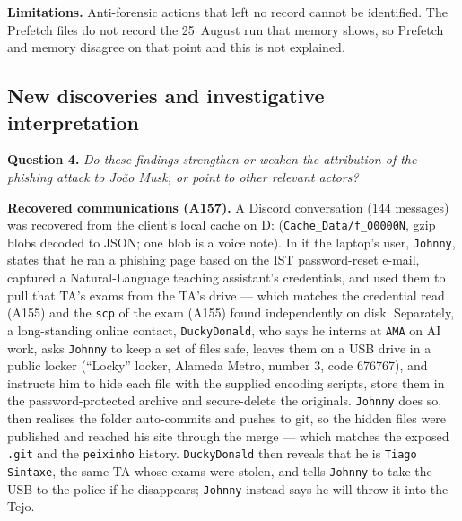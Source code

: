 \documentclass[11pt,a4paper,final,oneside]{article}
\begin{document}
\textbf{Limitations.} Anti-forensic actions that left no record cannot be identified. The Prefetch files do not record the 25~August run that memory shows, so Prefetch and memory disagree on that point and this is not explained.

\subsection{New discoveries and investigative interpretation}
\label{sec:q4}

\textbf{Question 4.} \textit{Do these findings strengthen or weaken the attribution of the phishing attack to João Musk, or point to other relevant actors?}

\textbf{Recovered communications (A157).} A Discord conversation (144 messages) was recovered from the client's local cache on D: (\texttt{Cache\_Data/f\_00000N}, gzip blobs decoded to JSON; one blob is a voice note). In it the laptop's user, \texttt{Johnny}, states that he ran a phishing page based on the IST password-reset e-mail, captured a Natural-Language teaching assistant's credentials, and used them to pull that TA's exams from the TA's drive --- which matches the credential read (A155) and the \texttt{scp} of the exam (A155) found independently on disk. Separately, a long-standing online contact, \texttt{DuckyDonald}, who says he interns at \texttt{AMA} on AI work, asks \texttt{Johnny} to keep a set of files safe, leaves them on a USB drive in a public locker (``Locky'' locker, Alameda Metro, number 3, code 676767), and instructs him to hide each file with the supplied encoding scripts, store them in the password-protected archive and secure-delete the originals. \texttt{Johnny} does so, then realises the folder auto-commits and pushes to git, so the hidden files were published and reached his site through the merge --- which matches the exposed \texttt{.git} and the \texttt{peixinho} history. \texttt{DuckyDonald} then reveals that he is \texttt{Tiago Sintaxe}, the same TA whose exams were stolen, and tells \texttt{Johnny} to take the USB to the police if he disappears; \texttt{Johnny} instead says he will throw it into the Tejo.
\end{document}
